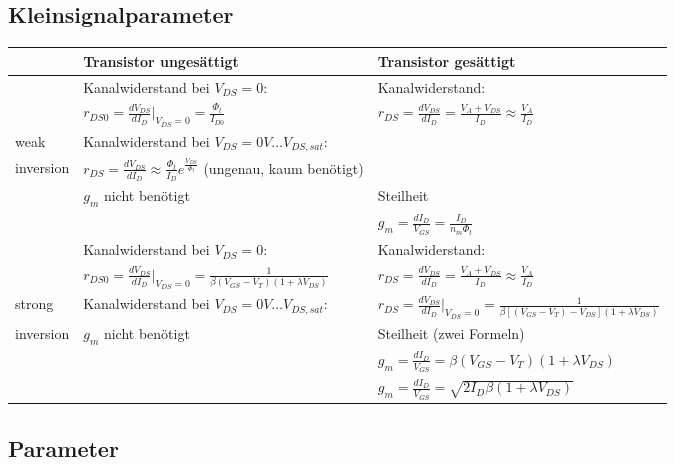 \subsection{Kleinsignalparameter}
\begin{tabularx}{\linewidth}{|X|l|l|}
	\hline
		& \textbf{Transistor ungesättigt} & \textbf{Transistor gesättigt} 
	\\ \hline
		& Kanalwiderstand bei $V_{DS}=0$:
		& Kanalwiderstand:
	\\
		& $r_{DS0} = \frac{dV_{DS}}{dI_D}|_{V_{DS}=0} = \frac{\Phi_t}{I_{D0}}$
		& $r_{DS} = \frac{dV_{DS}}{dI_D} = \frac{V_A + V_{DS}}{I_D} \approx \frac{V_A}{I_D}$
	\\ weak
		& Kanalwiderstand bei $V_{DS} = 0V \dots V_{DS,sat}$:
		& 
	\\ inversion
		& $r_{DS} = \frac{dV_{DS}}{dI_D} \approx \frac{\Phi_t}{I_D} e^{\frac{V_{DS}}{\Phi_t}}$ (ungenau, kaum benötigt)
		&
	\\ \cline{2-3}
		& $g_m$ nicht benötigt
		& Steilheit
	\\
		& 
		& $g_m =  \frac{dI_D}{V_{GS}} = \frac{I_D}{n_m \Phi_t}$	
	\\ \hline
		& Kanalwiderstand bei $V_{DS}=0$:
		& Kanalwiderstand:
	\\
		& $r_{DS0} = \frac{dV_{DS}}{dI_D}|_{V_{DS}=0} = \frac{1}{\beta (V_{GS} - V_T) (1 + \lambda V_{DS})}$
		& $r_{DS} = \frac{dV_{DS}}{dI_D} = \frac{V_A + V_{DS}}{I_D} \approx \frac{V_A}{I_D}$
	\\ strong
		& Kanalwiderstand bei $V_{DS} = 0V \dots V_{DS,sat}$:
		& $r_{DS} = \frac{dV_{DS}}{dI_D}|_{V_{DS}=0} = \frac{1}{\beta [(V_{GS} - V_T)-V_{DS}] (1 + \lambda V_{DS})}$
	\\ \cline{2-3} inversion
		& $g_m$ nicht benötigt
		& Steilheit (zwei Formeln)
	\\
		&
		& $g_m = \frac{dI_D}{V_{GS}} = \beta (V_{GS} - V_T) (1 + \lambda V_{DS})$
	\\
		&
		& $g_m = \frac{dI_D}{V_{GS}} = \sqrt{2 I_D \beta (1 + \lambda V_{DS})} $
	\\ \hline
\end{tabularx}

\subsection{Parameter}

